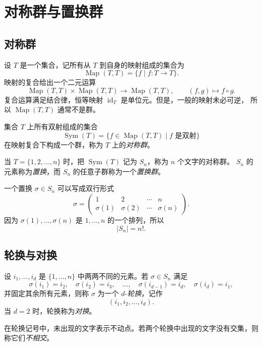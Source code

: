 \section{对称群与置换群}

\subsection{对称群}

设 $T$ 是一个集合，记所有从 $T$ 到自身的映射组成的集合为
\[
  \operatorname{Map}(T,T)=\{f\mid f\colon T\to T\}.
\]
映射的复合给出一个二元运算
\[
  \operatorname{Map}(T,T)\times\operatorname{Map}(T,T)
  \longrightarrow\operatorname{Map}(T,T),
  \qquad (f,g)\longmapsto f\circ g.
\]
复合运算满足结合律，恒等映射 $\operatorname{id}_T$ 是单位元。但是，一般的映射未必可逆，
所以 $\operatorname{Map}(T,T)$ 通常不是群。

\begin{definition}[对称群]
集合 $T$ 上所有双射组成的集合
\[
  \operatorname{Sym}(T)
  =\{f\in\operatorname{Map}(T,T)\mid f\text{ 是双射}\}
\]
在映射复合下构成一个群，称为 $T$ 上的\emph{对称群}。
\end{definition}

当 $T=\{1,2,\dots,n\}$ 时，把 $\operatorname{Sym}(T)$ 记为 $S_n$，称为 $n$ 个文字的对称群。
$S_n$ 的元素称为\emph{置换}，而 $S_n$ 的任意子群称为一个\emph{置换群}。

一个置换 $\sigma\in S_n$ 可以写成双行形式
\[
  \sigma=
  \begin{pmatrix}
    1&2&\cdots&n\\
    \sigma(1)&\sigma(2)&\cdots&\sigma(n)
  \end{pmatrix}.
\]
因为 $\sigma(1),\dots,\sigma(n)$ 是 $1,\dots,n$ 的一个排列，所以
\[
  |S_n|=n!.
\]

\subsection{轮换与对换}

\begin{definition}[轮换]
设 $i_1,\dots,i_d$ 是 $\{1,\dots,n\}$ 中两两不同的元素。若 $\sigma\in S_n$ 满足
\[
  \sigma(i_1)=i_2,\quad \sigma(i_2)=i_3,\quad\dots,\quad
  \sigma(i_{d-1})=i_d,\quad \sigma(i_d)=i_1,
\]
并固定其余所有元素，则称 $\sigma$ 为一个 $d$-\emph{轮换}，记作
\[
  (i_1,i_2,\dots,i_d).
\]
当 $d=2$ 时，轮换称为\emph{对换}。
\end{definition}

在轮换记号中，未出现的文字表示不动点。若两个轮换中出现的文字没有交集，则称它们\emph{不相交}。

